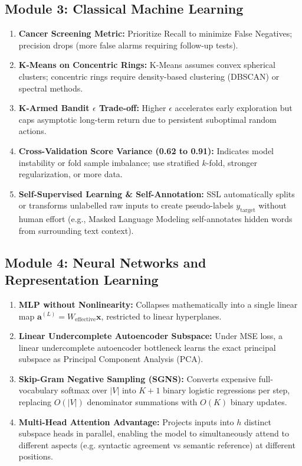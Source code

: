 \documentclass[11pt,a4paper]{article}
\begin{document}
	\subsection*{Module 3: Classical Machine Learning}
	\begin{enumerate}
		\item \textbf{Cancer Screening Metric:} Prioritize Recall to minimize False Negatives; precision drops (more false alarms requiring follow-up tests).
		\item \textbf{K-Means on Concentric Rings:} K-Means assumes convex spherical clusters; concentric rings require density-based clustering (DBSCAN) or spectral methods.
		\item \textbf{K-Armed Bandit $\epsilon$ Trade-off:} Higher $\epsilon$ accelerates early exploration but caps asymptotic long-term return due to persistent suboptimal random actions.
		\item \textbf{Cross-Validation Score Variance (0.62 to 0.91):} Indicates model instability or fold sample imbalance; use stratified $k$-fold, stronger regularization, or more data.
		\item \textbf{Self-Supervised Learning \& Self-Annotation:} SSL automatically splits or transforms unlabelled raw inputs to create pseudo-labels $y_{\text{target}}$ without human effort (e.g., Masked Language Modeling self-annotates hidden words from surrounding text context).
	\end{enumerate}

	\subsection*{Module 4: Neural Networks and Representation Learning}
	\begin{enumerate}
		\item \textbf{MLP without Nonlinearity:} Collapses mathematically into a single linear map $\mathbf{a}^{(L)} = W_{\text{effective}}\mathbf{x}$, restricted to linear hyperplanes.
		\item \textbf{Linear Undercomplete Autoencoder Subspace:} Under MSE loss, a linear undercomplete autoencoder bottleneck learns the exact principal subspace as Principal Component Analysis (PCA).
		\item \textbf{Skip-Gram Negative Sampling (SGNS):} Converts expensive full-vocabulary softmax over $|V|$ into $K+1$ binary logistic regressions per step, replacing $O(|V|)$ denominator summations with $O(K)$ binary updates.
		\item \textbf{Multi-Head Attention Advantage:} Projects inputs into $h$ distinct subspace heads in parallel, enabling the model to simultaneously attend to different aspects (e.g. syntactic agreement vs semantic reference) at different positions.
	\end{enumerate}
\end{document}
